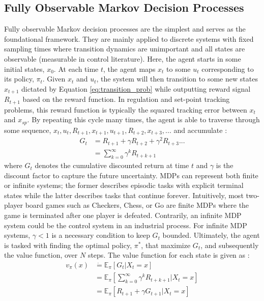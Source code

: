 \subsection{Fully Observable Markov Decision Processes}
Fully observable Markov decision processes are the simplest and serves as the foundational framework.  They are mainly applied to discrete systems with fixed sampling times where transition dynamics are unimportant and all states are observable (measurable in control literature). Here, the agent starts in some initial states, $x_0$. At each time $t$, the agent maps $x_t$ to some $u_t$ corresponding to its policy, $\pi_t$.  Given $x_t$ and $u_t$, the system will then transition to some new states $x_{t+1}$ dictated by Equation \ref{eq:transition_prob} while outputting reward signal $R_{t+1}$ based on the reward function. In regulation and set-point tracking problems, this reward function is typically the squared tracking error between $x_t$ and $x_{sp}$.  By repeating this cycle many times, the agent is able to traverse through some sequence, $x_t, u_t, R_{t+1}, x_{t+1}, u_{t+1}, R_{t+2}, x_{t+3}, ...$ and accumulate \cite{sutton}:
\begin{align}
G_t &= R_{t+1} + \gamma R_{t+2} + \gamma^2 R_{t+3} ... \\
    &= \sum\limits^{\infty}_{k = 0} \gamma^k R_{t+k+1}
\label{eq:return}
\end{align}
where $G_t$ denotes the cumulative discounted return at time $t$ and $\gamma$ is the discount factor to capture the future uncertainty. MDPs can represent both finite or infinite systems; the former describes episodic tasks with explicit terminal states while the latter describes tasks that continue forever.  Intuitively, most two-player board games such as Checkers, Chess, or Go are finite MDPs where the game is terminated after one player is defeated.  Contrarily, an infinite MDP system could be the control system in an industrial process. For infinite MDP systems, $\gamma < 1$ is a necessary condition to keep $G_t$ bounded. Ultimately, the agent is tasked with finding the optimal policy, $\pi^*$, that maximize $G_t$, and subsequently the value function, over $N$ steps. The value function for each state is given as \cite{sutton}:
\begin{align}
    v_\pi (x) &\dot{=} \mathbb{E}_\pi [G_t | X_t = x] \\
              &= \mathbb{E}_\pi \left[\sum\limits^\infty_{k=0} \gamma^k R_{t+k+1} | X_t = x \right] \\
              &= \mathbb{E}_\pi [R_{t+1} + \gamma G_{t+1} | X_t = x]
    \label{eq:value_func}
\end{align}
